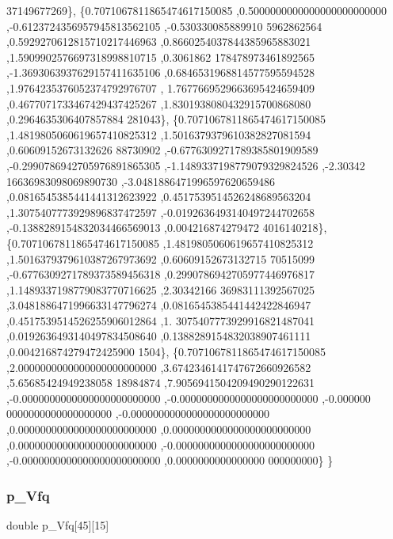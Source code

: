 \begin{DoxyCode}
      37149677269\},
\{0.7071067811865474617150085 ,0.5000000000000000000000000 ,-0.6123724356957945813562105 ,-0.530330085889910
      5962862564 ,0.5929270612815710217446963 ,0.8660254037844385965883021 ,1.5909902576697318998810715 ,0.3061862
      178478973461892565 ,-1.3693063937629157411635106 ,0.6846531968814577595594528 ,1.9764235376052374792976707 ,
      1.7677669529663695424659409 ,0.4677071733467429437425267 ,1.8301938080432915700868080 ,0.2964635306407857884
      281043\},
\{0.7071067811865474617150085 ,1.4819805060619657410825312 ,1.5016379379610382827081594 ,0.60609152673132626
      88730902 ,-0.6776309271789385801909589 ,-0.2990786942705976891865305 ,-1.1489337198779079329824526 ,-2.30342
      16636983098069890730 ,-3.0481886471996597620659486 ,0.0816545385441441312623922 ,0.4517539514526248689563204
       ,1.3075407773929896837472597 ,-0.0192636493140497244702658 ,-0.1388289154832034466569013 ,0.004216874279472
      4016140218\},
\{0.7071067811865474617150085 ,1.4819805060619657410825312 ,1.5016379379610387267973692 ,0.60609152673132715
      70515099 ,-0.6776309271789373589456318 ,0.2990786942705977446976817 ,1.1489337198779083770716625 ,2.30342166
      36983111392567025 ,3.0481886471996633147796274 ,0.0816545385441442422846947 ,0.4517539514526255906012864 ,1.
      3075407773929916821487041 ,0.0192636493140497834508640 ,0.1388289154832038907461111 ,0.004216874279472425900
      1504\},
\{0.7071067811865474617150085 ,2.0000000000000000000000000 ,3.6742346141747672660926582 ,5.65685424949238058
      18984874 ,7.9056941504209490290122631 ,-0.0000000000000000000000000 ,-0.0000000000000000000000000 ,-0.000000
      0000000000000000000 ,-0.0000000000000000000000000 ,0.0000000000000000000000000 ,0.0000000000000000000000000 
      ,0.0000000000000000000000000 ,-0.0000000000000000000000000 ,-0.0000000000000000000000000 ,0.0000000000000000
      000000000\}
\}
\end{DoxyCode}
\mbox{\label{a00996_aa2cc1ce595d4ba1849e1aaa28c401463}} 
\subsubsection{\texorpdfstring{p\+\_\+\+Vfq}{p\_Vfq}}
{\footnotesize\ttfamily double p\+\_\+\+Vfq\mbox{[}45\mbox{]}\mbox{[}15\mbox{]}}

